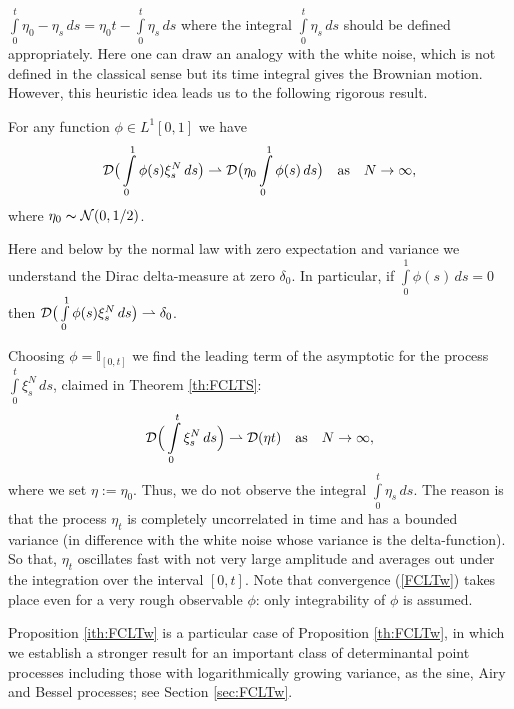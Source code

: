 \documentclass{article}
\numberwithin{equation}{section}
\newcommand{\mI}{\mathbb{I}}
\newcommand{\DD}{{\cal D}}
\newcommand{\NN}{{\cal N}}
\newcommand{\ra}{\rightarrow}
\newcommand{\volna}{\thicksim}
\newcommand{\raw}{\rightharpoonup}
\newcommand{\ili}{\int\limits}
\newcommand{\lbl}{\label}
\newcommand{\ass}{\quad\mbox{as}\quad}
\newcommand{\rtheo}{Theorem \nolinebreak}
\newcommand{\bee}{\begin{equation}}
\newcommand{\eee}{\end{equation}}
\newcommand{\bpp}{\begin{prop}}
\newcommand{\epp}{\end{prop}}
\newcommand{\brr}{\begin{rem}}
\newcommand{\err}{\end{rem}}
\begin{document}
$
\ili_0^t \eta_0 - \eta_s \,ds= \eta_0 t - \ili_0^t \eta_s \,ds
$
where the integral $\ili_0^t \eta_s \,ds$ should be defined appropriately.
Here one can draw an analogy with the white noise,
which is not defined in the classical sense but its time integral gives the Brownian motion.
However, this heuristic idea leads us to the following rigorous result.
\bpp\lbl{ith:FCLTw}
For any function $\phi\in L^1[0,1]$ we have
\bee\lbl{FCLTw}
\DD\big(\ili_0^1 \phi(s)\xi^N_s\, ds\big) \raw \DD\big(\eta_0\ili_0^1 \phi(s)\,ds\big)  \ass N\ra\infty,
\eee
where $\eta_0\volna \NN(0,1/2)$.
\epp
\brr\lbl{rem:zerocovdelta}
Here and below by the normal law with zero expectation and variance
we understand the Dirac delta-measure at zero $\delta_0$.
In particular, if $\ili_0^1 \phi(s)\,ds=0$ then $\DD\big(\ili_0^1 \phi(s)\xi^N_s\, ds\big)\raw\delta_0$.
\err
Choosing
$\phi=\mI_{[0,t]}$
we find the leading term of the asymptotic
for the process $\ili_0^t \xi^N_s \,ds$, claimed in \rtheo \ref{th:FCLTS}:
\bee\lbl{mainorderintro}
\DD\Big(\ili_0^t \xi^N_s \,ds\Big) \raw \DD(\eta t) \ass N\ra\infty,
\eee
where we set $\eta:=\eta_0$.
Thus, we do not observe the integral $\ili_0^t \eta_s \,ds$.
The reason is that the process $\eta_t$ is completely uncorrelated in time
and has a bounded variance
(in difference with the white noise whose variance is the delta-function).
So that, $\eta_t$ oscillates fast with not very large amplitude
and averages out under the integration over the interval $[0,t]$.
Note that convergence (\ref{FCLTw}) takes place
even for a very rough observable $\phi$:
only integrability of $\phi$ is assumed.

Proposition \ref{ith:FCLTw} is a particular case of Proposition \ref{th:FCLTw},
in which we establish a stronger result
for an important class of determinantal point processes
including those with logarithmically growing variance,
as the sine, Airy and Bessel processes;
see Section \nolinebreak \ref{sec:FCLTw}.
\end{document}

